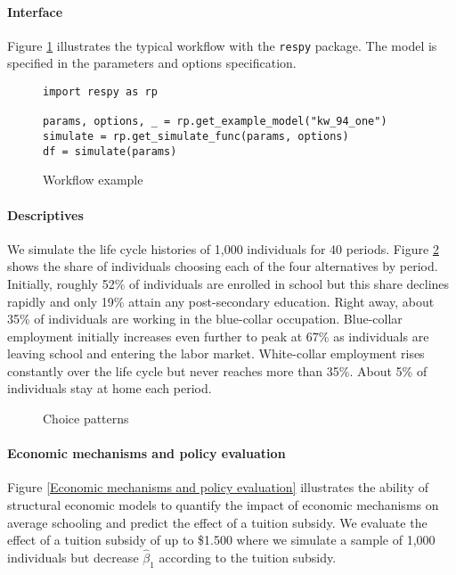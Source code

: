 \paragraph{Interface} Figure \ref{Workflow example} illustrates the typical workflow with the \verb+respy+ package. The model is specified in the parameters and options specification.

\begin{figure}[ht!]\centering
\caption{Workflow example}\label{Workflow example}
\begin{lstlisting}
import respy as rp

params, options, _ = rp.get_example_model("kw_94_one")
simulate = rp.get_simulate_func(params, options)
df = simulate(params)

\end{lstlisting}
\end{figure}

\paragraph{Descriptives} We simulate the life cycle histories of 1,000 individuals for 40 periods. Figure \ref{Descriptives} shows the share of individuals choosing each of the four alternatives by period. Initially, roughly 52\% of individuals are enrolled in school but this share declines rapidly and only 19\% attain any post-secondary education. Right away, about 35\% of individuals are working in the blue-collar occupation.  Blue-collar employment initially increases even further to peak at 67\% as individuals are leaving school and entering the labor market. White-collar employment rises constantly over the life cycle but never reaches more than 35\%. About 5\% of individuals stay at home each period.

\begin{figure}[ht!]\centering
\caption{Choice patterns}\label{Descriptives}
\end{figure}\FloatBarrier

\paragraph{Economic mechanisms and policy evaluation} Figure \ref{Economic mechanisms and policy evaluation} illustrates the ability of structural economic models to quantify the impact of economic mechanisms on average schooling and predict the effect of a tuition subsidy.  We evaluate the effect of a tuition subsidy of up to \$1.500 where we simulate a sample of 1,000 individuals but decrease $\hat{\beta}_1$ according to the tuition subsidy.

